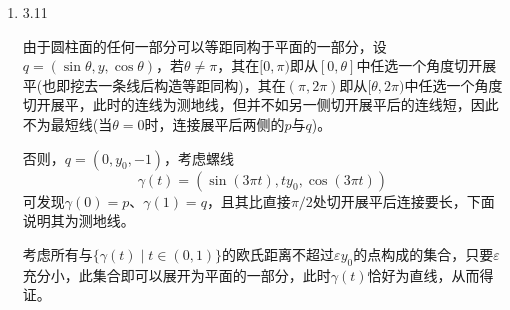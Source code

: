 \documentclass[a4paper,UTF8,fontset=windows,10pt]{ctexart}
\begin{document}
\begin{enumerate}
    \item 3.11
    
    由于圆柱面的任何一部分可以等距同构于平面的一部分，设$q=(\sin\theta,y,\cos\theta)$，若$\theta\ne\pi$，其在$[0,\pi)$即从$[0,\theta]$中任选一个角度切开展平(也即挖去一条线后构造等距同构)，其在$(\pi,2\pi)$即从$[\theta,2\pi)$中任选一个角度切开展平，此时的连线为测地线，但并不如另一侧切开展平后的连线短，因此不为最短线(当$\theta=0$时，连接展平后两侧的$p$与$q$)。
    
    否则，$q=(0,y_0,-1)$，考虑螺线
    $$\gamma(t)=(\sin(3\pi t),ty_0,\cos(3\pi t))$$
    可发现$\gamma(0)=p$、$\gamma(1)=q$，且其比直接$\pi/2$处切开展平后连接要长，下面说明其为测地线。
    
    考虑所有与$\{\gamma(t)\mid t\in(0,1)\}$的欧氏距离不超过$\varepsilon y_0$的点构成的集合，只要$\varepsilon$充分小，此集合即可以展开为平面的一部分，此时$\gamma(t)$恰好为直线，从而得证。
\end{enumerate}
\end{document}
